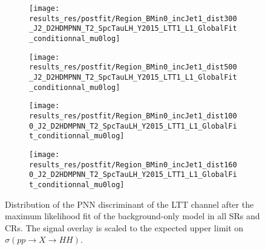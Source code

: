 \begin{figure}[htbp]
  \centering

  \begin{subfigure}{0.495\textwidth}
    \centering

    \texttt{[image: results\_res/postfit/Region\_BMin0\_incJet1\_dist300\_J2\_D2HDMPNN\_T2\_SpcTauLH\_Y2015\_LTT1\_L1\_GlobalFit\_conditionnal\_mu0log]}
  \end{subfigure}\hfill%
  \begin{subfigure}{0.495\textwidth}
    \centering

    \texttt{[image: results\_res/postfit/Region\_BMin0\_incJet1\_dist500\_J2\_D2HDMPNN\_T2\_SpcTauLH\_Y2015\_LTT1\_L1\_GlobalFit\_conditionnal\_mu0log]}
  \end{subfigure}

  \begin{subfigure}{0.495\textwidth}
    \centering

    \texttt{[image: results\_res/postfit/Region\_BMin0\_incJet1\_dist1000\_J2\_D2HDMPNN\_T2\_SpcTauLH\_Y2015\_LTT1\_L1\_GlobalFit\_conditionnal\_mu0log]}
  \end{subfigure}\hfill%
  \begin{subfigure}{0.495\textwidth}
    \centering

    \texttt{[image: results\_res/postfit/Region\_BMin0\_incJet1\_dist1600\_J2\_D2HDMPNN\_T2\_SpcTauLH\_Y2015\_LTT1\_L1\_GlobalFit\_conditionnal\_mu0log]}
  \end{subfigure}

  \caption{Distribution of the PNN discriminant of the \lephad LTT
    channel after the maximum likelihood fit of the background-only
    model in all SRs and CRs. The signal overlay is
    scaled to the expected upper limit on $\sigma(pp \to X \to HH)$.}
\end{figure}




